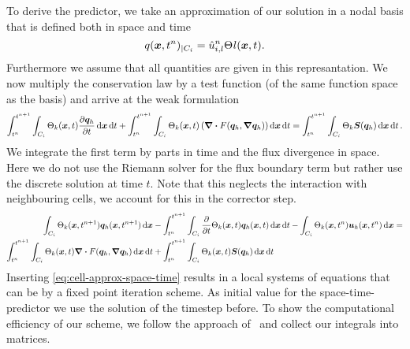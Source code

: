 To derive the predictor, we take an approximation of our solution in a nodal basis that is defined both in space and time
\begin{equation}
  \label{eq:cell-approx-space-time}
  q(\bm{x}, t^n)_{|\cell[i]} = \hat{u}^n_{i,l} \stbasis{l}(\bm{x}, t).
\end{equation}
Furthermore we assume that all quantities are given in this represantation.
We now multiply the conservation law by a test function (of the same function space as the basis) and arrive at the weak formulation
\begin{equation}\label{eq:weak-pde-space-time}
\intdt{\intdcell{
    \sttestfunction{k}(\bm{x}, t)
    \pdv{\stpredictor}{t}
}}
+
\intdt{\intdcell{
    \sttestfunction{k}(\bm{x}, t)
    \left(
      \divergence{\flux(\stpredictor, \gradient{\stpredictor})}
    \right)
}}
=
\intdt{\intdcell{
  \sttestfunction{k} \source(\stpredictor)
}}.
\end{equation}
We integrate the first term by parts in time and the flux divergence in space.
Here we do not use the Riemann solver for the flux boundary term but rather use the discrete solution at time $t$.
Note that this neglects the interaction with neighbouring cells, we account for this in the corrector step.
\begin{align}\label{eq:space-time-predictor}
\begin{split}
\intdcell{
  \sttestfunction{k} (\bm{x}, t^{n+1}) \stpredictor(\bm{x}, t^{n+1})
}
&-
\intdt{\intdcell{
    \pdv{}{t} \sttestfunction{k}(\bm{x}, t) \stpredictor(\bm{x}, t)
}}
-
\intdcell{
  \sttestfunction{k}(\bm{x},t^n) \dsol(\bm{x}, t^n)
} = \\
\intdt{\intdcell{
    \sttestfunction{k}(\bm{x},t) \divergence{\flux(\stpredictor, \gradient{\stpredictor})}
}}
&+
\intdt{\intdcell{
    \sttestfunction{k}(\bm{x}, t) \source(\stpredictor)
}}
\end{split}
\end{align}
Inserting \cref{eq:cell-approx-space-time} results in a local systems of equations that can be by a fixed point iteration scheme.
As initial value for the space-time-predictor we use the solution of the timestep before.
To show the computational efficiency of our scheme, we follow the approach of~\cite{dumbser2008unified} and collect our integrals into matrices.

